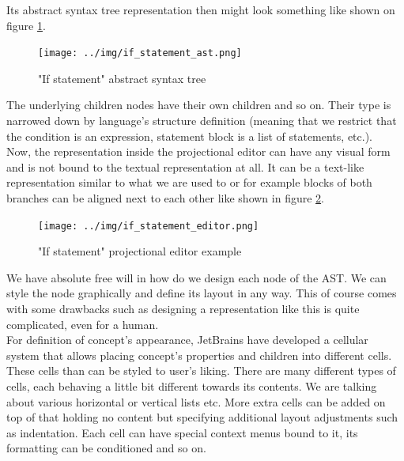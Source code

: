 \vspace{3mm}

Its abstract syntax tree representation then might look something like shown on figure \ref{fig:if_ast}.
\\

\begin{figure}[h]
	\centering
	\texttt{[image: ../img/if\_statement\_ast.png]}
	\caption{"If statement" abstract syntax tree}
	\label{fig:if_ast}
\end{figure}

The underlying children nodes have their own children and so on. Their type is narrowed down by language's structure definition (meaning that we restrict that the condition is an expression, statement block is a list of statements, etc.). 
\\

Now, the representation inside the projectional editor can have any visual form and is not bound to the textual representation at all. It can be a text-like representation similar to what we are used to or for example blocks of both branches can be aligned next to each other like shown in figure \ref{fig:if_editor}.
\\

\begin{figure}[h]
	\centering
	\hspace{-4mm}
	\texttt{[image: ../img/if\_statement\_editor.png]}
	\caption{"If statement" projectional editor example}
	\label{fig:if_editor}
\end{figure}

We have absolute free will in how do we design each node of the AST. We can style the node graphically and define its layout in any way. This of course comes with some drawbacks such as designing a representation like this is quite complicated, even for a human.
\\

For definition of concept's appearance, JetBrains have developed a cellular system that allows placing concept's properties and children into different cells. These cells than can be styled to user's liking. There are many different types of cells, each behaving a little bit different towards its contents. We are talking about various horizontal or vertical lists etc. More extra cells can be added on top of that holding no content but specifying additional layout adjustments such as indentation. Each cell can have special context menus bound to it, its formatting can be conditioned and so on.

